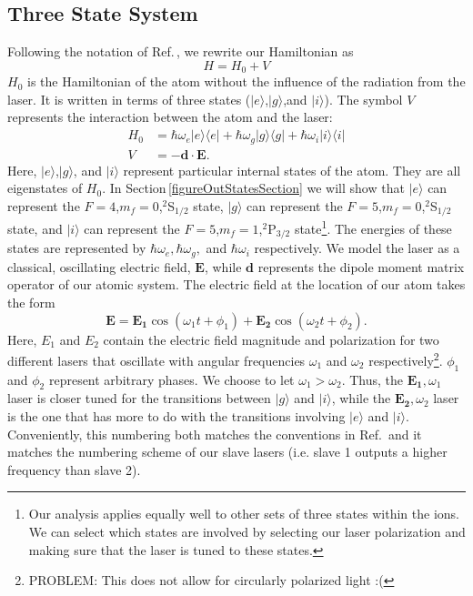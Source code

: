 \subsection{Three State System}
Following the notation of Ref.\,\cite{Young1997363}, we rewrite our Hamiltonian as
\begin{equation}
H=H_0+V
\end{equation}
$H_0$ is the Hamiltonian of the atom without the influence of the radiation from the laser. It is written in terms of three states ($|e\rangle$,$|g\rangle$,and $|i\rangle$). The symbol $V$ represents the interaction between the atom and the laser: 
\begin{align}
H_0&=
\hbar\omega_e |e\rangle\langle e | +
\hbar\omega_g |g\rangle\langle g | +
\hbar\omega_i |i\rangle\langle i | \\ 
V&=-\mathbf{d}\cdot\mathbf{E}.
\end{align}
Here, $|e\rangle$,$|g\rangle$, and $|i\rangle$ represent particular internal states of the atom. They are all eigenstates of $H_0$. In Section\,\ref{figureOutStatesSection} we will show that $|e\rangle$ can represent the $F=4$,$m_f=0$,$^2$S$_{1/2}$ state, $|g\rangle$ can represent the $F=5$,$m_f=0$,$^2$S$_{1/2}$ state, and $|i\rangle$ can represent the $F=5$,$m_f=1$,$^2$P$_{3/2}$ state\footnote{Our analysis applies equally well to other sets of three states within the ions. We can select which states are involved by selecting our laser polarization and making sure that the laser is tuned to these states.}. The energies of these states are represented by $\hbar\omega_e,\hbar\omega_g,$ and $\hbar\omega_i$ respectively. We model the laser as a classical, oscillating electric field, $\mathbf{E}$, while $\mathbf{d}$ represents the dipole moment matrix operator of our atomic system. The electric field at the location of our atom takes the form 
\begin{equation}
\mathbf{E}=\mathbf{E_1} \cos(\omega_1 t + \phi_1) + \mathbf{E_2} \cos(\omega_2t + \phi_2). \label{eqn:Efield}
\end{equation}
Here, $E_1$ and $E_2$ contain the electric field magnitude and polarization for two different lasers that oscillate with angular frequencies $\omega_1$ and $\omega_2$ respectively\footnote{PROBLEM: This does not allow for circularly polarized light :(}. $\phi_1$ and $\phi_2$ represent arbitrary phases. We choose to let $\omega_1>\omega_2$. Thus, the $\mathbf{E_1}, \omega_1$ laser is closer tuned for the transitions between $|g\rangle$ and $|i\rangle$, while the $\mathbf{E_2}, \omega_2$ laser is the one that has more to do with the transitions involving $|e\rangle$ and $|i\rangle$. Conveniently, this numbering both matches the conventions in Ref.\,\cite{Young1997363} and it matches the numbering scheme of our slave lasers (i.e. slave 1 outputs a higher frequency than slave 2). 

